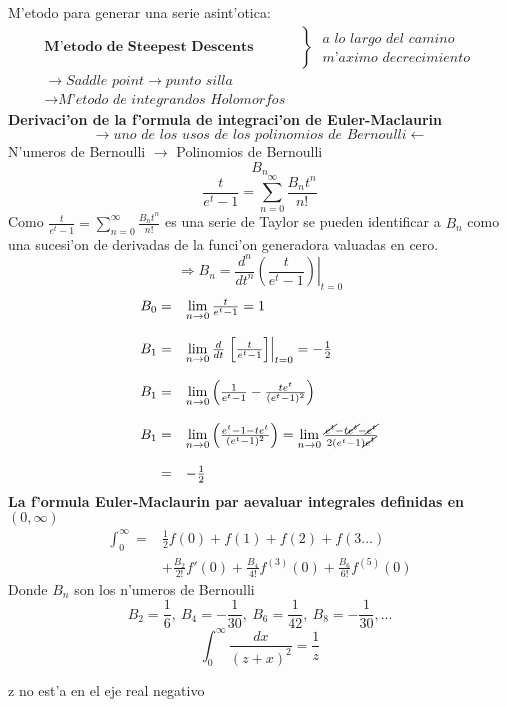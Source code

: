 \documentclass{article}
\theoremstyle{definition}
\begin{document}
M'etodo para generar una serie asint'otica:
\[\begin{array}{ll}
	\textbf{M'etodo de Steepest Descents}
	&\left\}\begin{array}{ll}
		\textit{a lo largo del camino}\\
		\textit{m'aximo decrecimiento}	
	\end{array}\right.\\
	\to \textit{Saddle point}\to \textit{punto silla}\\
	\to \textit{M'etodo de integrandos Holomorfos}
\end{array}\]
\textbf{Derivaci'on de la f'ormula de integraci'on de Euler-Maclaurin}
\[\longrightarrow \textit{uno de los usos de los polinomios de Bernoulli}\longleftarrow\]
N'umeros de Bernoulli $\longrightarrow$ Polinomios de Bernoulli
\[B_n\]
\[\frac{t}{e^t-1}=\sum^{\infty}_{n=0}\frac{B_nt^n}{n!}\]
Como $\frac{t}{e^t-1}=\sum^{\infty}_{n=0}\frac{B_nt^n}{n!}$ es una serie de Taylor se pueden identificar a $B_n$ como una sucesi'on de derivadas de la funci'on generadora valuadas en cero.
\[\Rightarrow B_n=\frac{d^n}{dt^n}\left.\left(\frac{t}{e^t-1}\right)\right|_{t=0}\]
\[
\begin{array}{rl}
	B_0=&\lim\limits_{n\to 0}\frac{t}{e^t-1}=1\\
	\\
	B_1=&\lim\limits_{n\to 0}\frac{d}{dt}\left.\left[\frac{t}{e^t-1}\right]\right|_{t=0}=-\frac{1}{2}\\
	\\
	B_1=& \lim\limits_{n\to 0}\left(\frac{1}{e^t-1}-\frac{te^t}{(e^t-1)^2}\right)\\
	\\
	B_1=& \lim\limits_{n\to 0}\left(\frac{e^t-1-te^t}{(e^t-1)^2}\right)=\lim\limits_{n\to 0}\frac{\cancel{e^t}-t\cancel{e^t}-\cancel{e^t}}{2(e^t-1)\cancel{e^t}}\\
	\\
	=& -\frac{1}{2}
\end{array}\]
\textbf{La f'ormula Euler-Maclaurin par aevaluar integrales definidas en $(0,\infty)$}
\[
\begin{array}{rl}
	\int^{\infty}_0=&\frac{1}{2}f(0)+f(1)+f(2)+f(3...)\\
	&+\frac{B_2}{2!}f'(0)+\frac{B_4}{4!}f^{(3)}(0)+\frac{B_6}{6!}f^{(5)}(0)
\end{array}\]
Donde $B_n$ son los n'umeros de Bernoulli
\[B_2=\frac{1}{6},\ B_4=-\frac{1}{30},\ B_6=\frac{1}{42},\ B_8=-\frac{1}{30},...\]
\[\int^{\infty}_0\frac{dx}{(z+x)^2}=\frac{1}{z}\]
\begin{center}
	z no est'a en el eje real negativo
\end{center}
\end{document}
